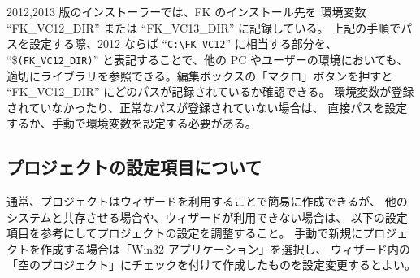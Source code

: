 \documentclass[a4j]{jarticle}
\begin{document}
2012,2013 版のインストーラーでは、FK のインストール先を
環境変数 ``FK\_VC12\_DIR'' または ``FK\_VC13\_DIR'' に記録している。
上記の手順でパスを設定する際、2012 ならば ``\verb+C:\FK_VC12+'' に相当する部分を、
``\$\verb+(FK_VC12_DIR)+'' と表記することで、他の PC やユーザーの環境においても、
適切にライブラリを参照できる。編集ボックスの「マクロ」ボタンを押すと
``FK\_VC12\_DIR'' にどのパスが記録されているか確認できる。
環境変数が登録されていなかったり、正常なパスが登録されていない場合は、
直接パスを設定するか、手動で環境変数を設定する必要がある。


\subsection{プロジェクトの設定項目について}
通常、プロジェクトはウィザードを利用することで簡易に作成できるが、
他のシステムと共存させる場合や、ウィザードが利用できない場合は、
以下の設定項目を参考にしてプロジェクトの設定を調整すること。
手動で新規にプロジェクトを作成する場合は「Win32 アプリケーション」を選択し、
ウィザード内の「空のプロジェクト」にチェックを付けて作成したものを設定変更するとよい。
\end{document}

